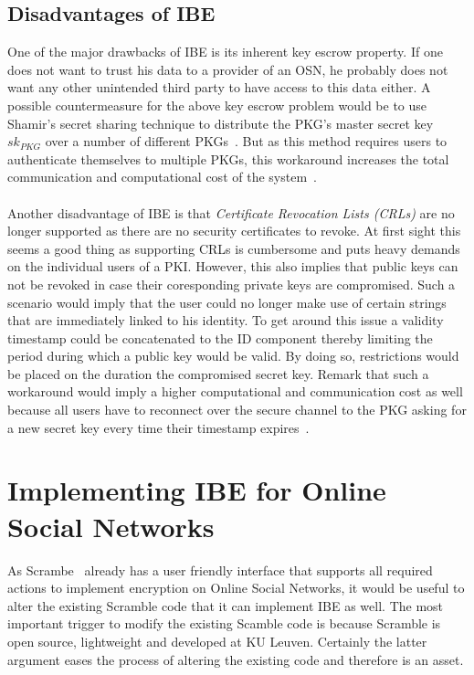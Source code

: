 \documentclass[journal]{IEEEtran}
\begin{document}
\subsection{Disadvantages of IBE}\label{sec:possible-workarounds}
One of the major drawbacks of IBE is its inherent key escrow property. If one
does not want to trust his data to a provider of an OSN, he probably does
not want any other unintended third party to have access to this data either. A
possible countermeasure for the above key escrow problem would be to use
Shamir's secret sharing technique to distribute the PKG's master secret key
$sk_{PKG}$ over a number of different PKGs~\cite{BonehFranklinIBE}. But as this
method requires users to authenticate themselves to multiple PKGs, this
workaround increases the total communication and computational cost of the
system~\cite{Baek04asurvey}.\\
\\
Another disadvantage of IBE is that \textit{Certificate Revocation Lists (CRLs)}
are no longer supported as there are no security certificates to revoke. At
first sight this seems a good thing as supporting CRLs is cumbersome and puts
heavy demands on the individual users of a PKI. However, this also implies that
public keys can not be revoked in case their coresponding private keys are
compromised. Such a scenario would imply that the user could no longer make use
of certain strings that are immediately linked to his identity. To get around
this issue a validity timestamp could be concatenated to the ID component
thereby limiting the period during which a public key would be valid. By doing
so, restrictions would be placed on the duration the compromised
secret key. Remark that such a workaround would imply a
higher computational and communication cost as well because all users have to
reconnect over the secure channel to the PKG asking for a new secret key every
time their timestamp expires~\cite{YoungbloodIntroduction}.

\section{Implementing IBE for Online Social Networks}
As Scrambe~\cite{BeatoScramble} already has a user friendly interface that
supports all required actions to implement encryption on Online Social Networks,
it would be useful to alter the existing Scramble code that it can implement
IBE as well. The most important trigger to modify the existing Scamble code is
because Scramble is open source, lightweight and developed at KU Leuven.
Certainly the latter argument eases the process of altering the existing code
and therefore is an asset.
\end{document}
